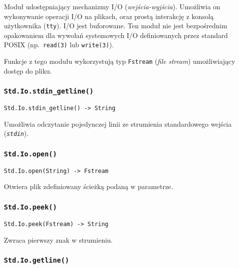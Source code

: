 Moduł udostępniający mechanizmy I/O (\emph{wejścia-wyjścia}). Umożliwia on
wykonywanie operacji I/O na plikach, oraz prostą interakcję z konsolą
użytkownika (\texttt{tty}). I/O jest buforowane. Ten moduł nie jest bezpośrednim
opakowaniem dla wywołań systemowych I/O definiowanych przez standard POSIX
(np.~\texttt{read(3)} lub \texttt{write(3)}).

Funkcje z tego modułu wykorzystują typ \texttt{Fstream} (\emph{file stream})
umożliwiający dostęp do pliku.

\subsubsection{\texttt{Std.Io.stdin\_getline()}}

\begin{small}
\begin{lstlisting}
Std.Io.stdin_getline() -> String
\end{lstlisting}
\end{small}

Umożliwia odczytanie pojedynczej linii ze strumienia standardowego wejścia (\emph{\texttt{stdin}}).

\subsubsection{\texttt{Std.Io.open()}}

\begin{small}
\begin{lstlisting}
Std.Io.open(String) -> Fstream
\end{lstlisting}
\end{small}

Otwiera plik zdefiniowany ścieżką podaną w parametrze.

\subsubsection{\texttt{Std.Io.peek()}}

\begin{small}
\begin{lstlisting}
Std.Io.peek(Fstream) -> String
\end{lstlisting}
\end{small}

Zwraca pierwszy znak w strumieniu.

\subsubsection{\texttt{Std.Io.getline()}}

